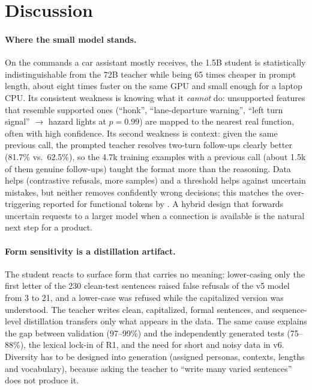 \section{Discussion}
\label{sec:discussion}

\paragraph{Where the small model stands.} On the commands a car assistant mostly receives, the 1.5B student is statistically
indistinguishable from the 72B teacher while being 65 times cheaper in prompt length, about eight times faster on the same GPU
and small enough for a laptop CPU. Its consistent weakness is knowing what it \emph{cannot} do: unsupported features that
resemble supported ones (``honk'', ``lane-departure warning'', ``left turn signal'' $\rightarrow$ hazard lights at $p=0.99$)
are mapped to the nearest real function, often with high confidence. Its second weakness is context: given the same previous
call, the prompted teacher resolves two-turn follow-ups clearly better (81.7\% vs.\ 62.5\%), so the 4.7k training examples
with a previous call (about 1.5k of them genuine follow-ups) taught the format more than the reasoning. Data helps (contrastive refusals, more samples) and a threshold helps against uncertain mistakes, but
neither removes confidently wrong decisions; this matches the over-triggering reported for functional tokens by
\citet{jafarzadeh2026fixedkeys}. A hybrid design that forwards uncertain requests to a larger model when a connection is
available is the natural next step for a product.

\paragraph{Form sensitivity is a distillation artifact.} The student reacts to surface form that carries no meaning:
lower-casing only the first letter of the 230 clean-test sentences raised false refusals of the v5 model from 3 to 21, and a
lower-case
 was refused while the capitalized version was understood. The teacher writes
clean, capitalized, formal sentences, and sequence-level distillation transfers only what appears in the data. The same cause
explains the gap between validation (97--99\%) and the independently generated tests (75--88\%), the lexical lock-in of R1, and
the need for short and noisy data in v6. Diversity has to be designed into generation (assigned personas, contexts, lengths
and vocabulary), because asking the teacher to ``write many varied sentences'' does not produce it.

